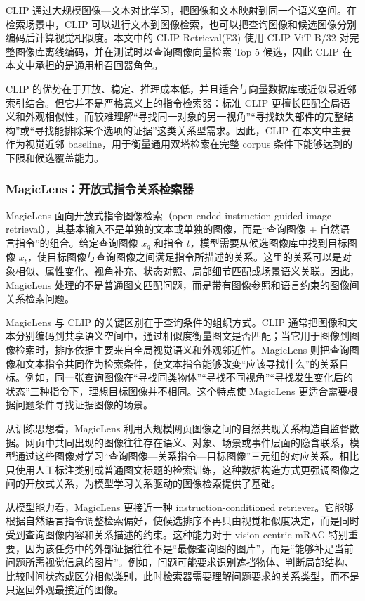 CLIP 通过大规模图像—文本对比学习，把图像和文本映射到同一个语义空间\cite{radford2021clip}。在检索场景中，CLIP 可以进行文本到图像检索，也可以把查询图像和候选图像分别编码后计算视觉相似度。本文中的 CLIP Retrieval(E3) 使用 CLIP ViT-B/32 对完整图像库离线编码，并在测试时以查询图像向量检索 Top-5 候选，因此 CLIP 在本文中承担的是通用粗召回器角色。

CLIP 的优势在于开放、稳定、推理成本低，并且适合与向量数据库或近似最近邻索引结合。但它并不是严格意义上的指令检索器：标准 CLIP 更擅长匹配全局语义和外观相似性，而较难理解“寻找同一对象的另一视角”“寻找缺失部件的完整结构”或“寻找能排除某个选项的证据”这类关系型需求。因此，CLIP 在本文中主要作为视觉近邻 baseline，用于衡量通用双塔检索在完整 corpus 条件下能够达到的下限和候选覆盖能力。

\subsubsection{MagicLens：开放式指令关系检索器}

MagicLens 面向开放式指令图像检索（open-ended instruction-guided image retrieval），其基本输入不是单独的文本或单独的图像，而是“查询图像 + 自然语言指令”的组合\cite{zhang2024magiclens}。给定查询图像 $x_q$ 和指令 $t$，模型需要从候选图像库中找到目标图像 $x_t$，使目标图像与查询图像之间满足指令所描述的关系。这里的关系可以是对象相似、属性变化、视角补充、状态对照、局部细节匹配或场景语义关联。因此，MagicLens 处理的不是普通图文匹配问题，而是带有图像参照和语言约束的图像间关系检索问题。

MagicLens 与 CLIP 的关键区别在于查询条件的组织方式。CLIP 通常把图像和文本分别编码到共享语义空间中，通过相似度衡量图文是否匹配；当它用于图像到图像检索时，排序依据主要来自全局视觉语义和外观邻近性。MagicLens 则把查询图像和文本指令共同作为检索条件，使文本指令能够改变“应该寻找什么”的关系目标。例如，同一张查询图像在“寻找同类物体”“寻找不同视角”“寻找发生变化后的状态”三种指令下，理想目标图像并不相同。这个特点使 MagicLens 更适合需要根据问题条件寻找证据图像的场景。

从训练思想看，MagicLens 利用大规模网页图像之间的自然共现关系构造自监督数据。网页中共同出现的图像往往存在语义、对象、场景或事件层面的隐含联系，模型通过这些图像对学习“查询图像—关系指令—目标图像”三元组的对应关系。相比只使用人工标注类别或普通图文标题的检索训练，这种数据构造方式更强调图像之间的开放式关系，为模型学习关系驱动的图像检索提供了基础。

从模型能力看，MagicLens 更接近一种 instruction-conditioned retriever。它能够根据自然语言指令调整检索偏好，使候选排序不再只由视觉相似度决定，而是同时受到查询图像内容和关系描述的约束。这种能力对于 vision-centric mRAG 特别重要，因为该任务中的外部证据往往不是“最像查询图的图片”，而是“能够补足当前问题所需视觉信息的图片”。例如，问题可能要求识别遮挡物体、判断局部结构、比较时间状态或区分相似类别，此时检索器需要理解问题要求的关系类型，而不是只返回外观最接近的图像。

